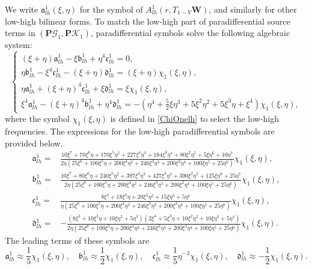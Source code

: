 \documentclass[10pt]{amsart}
\theoremstyle{remark}
\theoremstyle{definition}
\numberwithin{equation}{section}
\newcommand{\f}{\frac}
\newcommand{\bw}{\mathbf{W}}
\newcommand{\nP}{{\mathbf P}}
\begin{document}
We write $\mathfrak{a}^1_{lh}(\xi, \eta)$ for the symbol of $A^1_{lh}(r, T_{1-Y}\bw)$, and similarly for other low-high bilinear forms.
To match the low-high part of paradifferential source terms in $(\nP\mathcal{G}_1, \nP\mathcal{K}_1)$, paradifferential symbols solve the following algebraic system: 
\begin{equation*}
\begin{cases}
(\xi + \eta)\mathfrak{a}^1_{lh}-\xi\mathfrak{b}^1_{lh}+\eta^4\mathfrak{c}^1_{lh}=0,\\
\eta\mathfrak{b}^1_{lh}-\xi^4\mathfrak{c}^1_{lh}-(\xi+\eta)\mathfrak{d}^1_{lh}=(\xi+\eta)\chi_{1}(\xi,\eta),\\
\eta\mathfrak{a}^1_{lh}+(\xi+\eta)^4\mathfrak{c}^1_{lh}+\xi\mathfrak{d}^1_{lh}=\xi\chi_{1}(\xi,\eta),\\
\xi^4 \mathfrak{a}^1_{lh}-(\xi+\eta)^4\mathfrak{b}^1_{lh}+\eta^4\mathfrak{d}^1_{lh}=-\left(\eta^4+\f52\xi\eta^3+5\xi^2\eta^2+5\xi^3\eta+\xi^4\right)\chi_{1}(\xi,\eta),
\end{cases}
\end{equation*}
where  the symbol $\chi_{1}(\xi, \eta)$ is defined in \eqref{ChiOnelh} to select the low-high frequencies. The expressions for the low-high paradifferential symbols are provided below.
\begin{align*}
\mathfrak{a}^1_{lh}=&\f{10\xi^7+70\xi^6\eta+170\xi^5\eta^2+227\xi^4\eta^3+184\xi^3\eta^4+80\xi^2\eta^5+5\xi\eta^6+10\eta^7}{2\eta(25\xi^6+100\xi^5\eta+200\xi^4\eta^2+246\xi^3\eta^3+200\xi^2\eta^4+100\xi\eta^5+25\eta^6)}\chi_{1}(\xi,\eta),\\
\mathfrak{b}^1_{lh}=&\f{10\xi^7+80\xi^6\eta+240\xi^5\eta^2+397\xi^4\eta^3+427\xi^3\eta^4+300\xi^2\eta^5+125\xi\eta^6+25\eta^7}
{2\eta(25\xi^6+100\xi^5\eta+200\xi^4\eta^2+246\xi^3\eta^3+200\xi^2\eta^4+100\xi\eta^5+25\eta^6)}\chi_{1}(\xi,\eta),\\
\mathfrak{c}^1_{lh}=&\f{8\xi^4+18\xi^3\eta+20\xi^2\eta^2+15\xi\eta^3+5\eta^4}
{\eta(25\xi^6+100\xi^5\eta+200\xi^4\eta^2+246\xi^3\eta^3+200\xi^2\eta^4+100\xi\eta^5+25\eta^6)}\chi_{1}(\xi,\eta),\\
\mathfrak{d}^1_{lh}=&-\f{(8\xi^3+10\xi^2\eta+10\xi\eta^2+5\eta^3)(2\xi^4+5\xi^3\eta+10\xi^2\eta^2+10\xi\eta^3+5\eta^4)}
{2\eta(25\xi^6+100\xi^5\eta+200\xi^4\eta^2+246\xi^3\eta^3+200\xi^2\eta^4+100\xi\eta^5+25\eta^6)}\chi_{1}(\xi,\eta).
\end{align*}
The leading terms of these symbols are
\begin{equation*}
\mathfrak{a}^1_{lh} \approx\f15\chi_{1}(\xi, \eta), \quad \mathfrak{b}^1_{lh} \approx \f12\chi_{1}(\xi, \eta),  \quad \mathfrak{c}^1_{lh} \approx \f15\eta^{-3}\chi_{1}(\xi, \eta), \quad \mathfrak{d}^1_{lh} \approx -\f12\chi_{1}(\xi, \eta).   
\end{equation*}
\end{document}
